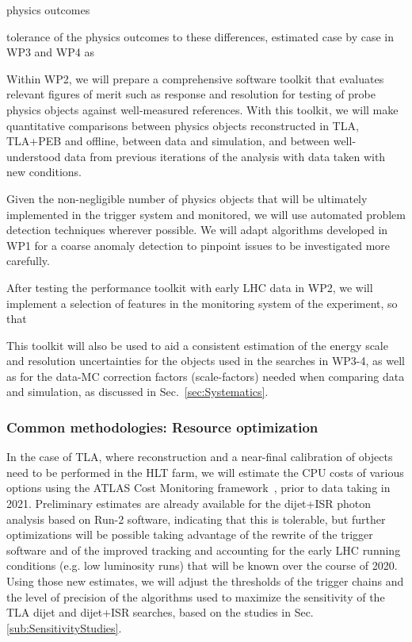 

 physics outcomes 

 tolerance of the physics outcomes to these differences, estimated case by case in WP3 and WP4 as 
 
 
Within WP2, we will prepare a comprehensive software toolkit that evaluates relevant figures of merit such as response and resolution for testing of probe physics objects against well-measured references. %
With this toolkit, we will make quantitative comparisons between physics objects reconstructed in TLA, TLA+PEB and offline, between data and simulation, and between well-understood data from previous iterations of the analysis with data taken with new conditions.  

Given the non-negligible number of physics objects that will be ultimately implemented in the trigger system and monitored, we will use automated problem detection techniques wherever possible. We will adapt algorithms developed in WP1 for a coarse anomaly detection to pinpoint issues to be investigated more carefully. 

After testing the performance toolkit with early LHC data in WP2, we will implement a selection of features in the monitoring system of the experiment, so that 

This toolkit will also be used to aid a consistent estimation of the energy scale and resolution uncertainties for the objects used in the searches in WP3-4, as well as for the data-MC correction factors (scale-factors) needed when comparing data and simulation, as discussed in Sec.~\ref{sec:Systematics}. 


\subsubsection{Common methodologies: Resource optimization}
\label{subsub:Resource optimization}



In the case of TLA, where reconstruction and a near-final calibration of objects need to be performed in the HLT farm, we will estimate the CPU costs of various options using the ATLAS Cost Monitoring framework~\cite{CostMonitoringTim}, prior to data taking in 2021.  
Preliminary estimates are already available for the dijet+ISR photon analysis based on Run-2 software, indicating that this is tolerable, but further optimizations will be possible taking advantage of the rewrite of the trigger software and of the improved tracking and accounting for the early LHC running conditions (e.g. low luminosity runs) that will be known over the course of 2020. Using those new estimates, we will adjust the thresholds of the trigger chains and the level of precision of the algorithms used to maximize the sensitivity of the TLA dijet and dijet+ISR searches, based on the studies in Sec.\ref{sub:SensitivityStudies}. 
 
